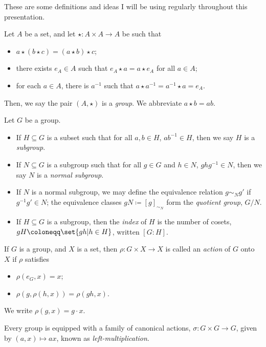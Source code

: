 \documentclass[10pt]{mypackage}
\begin{document}
\RaggedRight
These are some definitions and ideas I will be using regularly throughout this presentation.
\begin{definition}[Groups]
  Let $A$ be a set, and let $\star\colon A\times A \rightarrow A$ be such that
  \begin{itemize}
    \item $a\star\left( b\star c \right) = \left( a\star b \right)\star c$;
    \item there exists $e_A\in A$ such that $e_A\star a = a\star e_A$ for all $a\in A$;
    \item for each $a\in A$, there is $a^{-1}$ such that $a\star a^{-1} = a^{-1}\star a = e_{A}$.
  \end{itemize}
  Then, we say the pair $\left( A,\star \right)$ is a \textit{group}. We abbreviate $a\star b = ab$.
\end{definition}
\begin{definition}
  Let $G$ be a group.
  \begin{itemize}
    \item If $H\subseteq G$ is a subset such that for all $a,b\in H$, $ab^{-1}\in H$, then we say $H$ is a \textit{subgroup}.
    \item If $N\subseteq G$ is a subgroup such that for all $g\in G$ and $h\in N$, $ghg^{-1}\in N$, then we say $N$ is a \textit{normal subgroup}.
    \item If $N$ is a normal subgroup, we may define the equivalence relation $g\sim_{N}g'$  if $g^{-1}g'\in N$; the equivalence classes $gN\coloneqq \left[ g \right]_{\sim_N}$ form the \textit{quotient group}, $G/N$.
    \item If $H\subseteq G$ is a subgroup, then the \textit{index} of $H$ is the number of cosets, $gH\coloneqq \set{gh | h\in H}$, written $\left[ G:H \right]$.
  \end{itemize}
\end{definition}
\begin{definition}
  If $G$ is a group, and $X$ is a set, then $\rho\colon G\times X\rightarrow X$ is called an \textit{action} of $G$ onto $X$ if $\rho$ satisfies
  \begin{itemize}
    \item $\rho\left( e_G,x \right) = x$;
    \item $\rho\left( g,\rho\left( h,x \right) \right) = \rho\left( gh,x \right)$.
  \end{itemize}
  We write $\rho\left( g,x \right) = g\cdot x$.\newline

  Every group is equipped with a family of canonical actions, $\sigma\colon G\times G \rightarrow G$, given by $\left( a,x \right)\mapsto ax$, known as \textit{left-multiplication}.
\end{definition}
\end{document}
